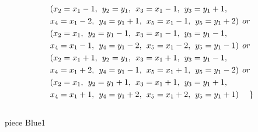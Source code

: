 \begin{align*}
&(x_{2} = x_{1}-1 ,\hspace{1ex}y_{2} = y_{1},\hspace{1ex}x_{3} = x_{1}-1,\hspace{1ex}y_{3} = y_{1}+1,
\\&x_{4} = x_{1}-2,\hspace{1ex}y_{4} = y_{1}+1,\hspace{1ex}x_{5} = x_{1}-1,\hspace{1ex}y_{5} = y_{1}+2)\hspace{1ex} or \\
&(x_{2} = x_{1} ,\hspace{1ex}y_{2} = y_{1}-1,\hspace{1ex}x_{3} = x_{1}-1,\hspace{1ex}y_{3} = y_{1}-1,
\\&x_{4} = x_{1}-1,\hspace{1ex}y_{4} = y_{1}-2,\hspace{1ex}x_{5} = x_{1}-2,\hspace{1ex}y_{5} = y_{1}-1)\hspace{1ex} or \\
&(x_{2} = x_{1}+1 ,\hspace{1ex}y_{2} = y_{1},\hspace{1ex}x_{3} = x_{1}+1,\hspace{1ex}y_{3} = y_{1}-1,
\\&x_{4} = x_{1}+2,\hspace{1ex}y_{4} = y_{1}-1,\hspace{1ex}x_{5} = x_{1}+1,\hspace{1ex}y_{5} = y_{1}-2)\hspace{1ex} or \\
&(x_{2} = x_{1} ,\hspace{1ex}y_{2} = y_{1}+1,\hspace{1ex}x_{3} = x_{1}+1,\hspace{1ex}y_{3} = y_{1}+1,
\\&x_{4} = x_{1}+1,\hspace{1ex}y_{4} = y_{1}+2,\hspace{1ex}x_{5} = x_{1}+2,\hspace{1ex}y_{5} = y_{1}+1)\hspace{3ex}\}
\end{align*}  
\\ piece Blue1 
